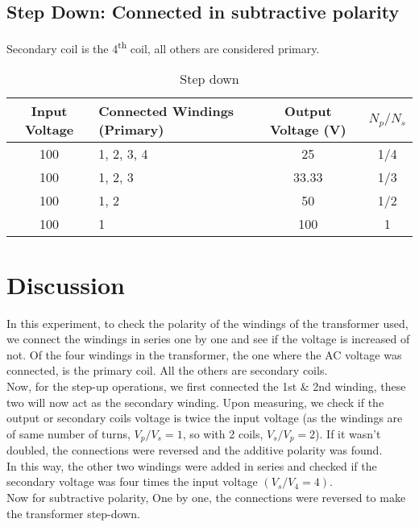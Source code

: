\documentclass[12pt]{article}
\begin{document}
\subsection*{Step Down: Connected in subtractive polarity}
Secondary coil is the 4\textsuperscript{th} coil, all others are considered primary.
\begin{table}[H]
    \centering
    \begin{tabular}{|c|l|c|c|}
        \hline
        Input Voltage & Connected Windings (Primary) & Output Voltage (V) & $N_p/N_s$ \\
        \hline
        100           & 1, 2, 3, 4                   & 25                 & 1/4       \\
        \hline
        100           & 1, 2, 3                      & 33.33              & 1/3       \\
        \hline
        100           & 1, 2                         & 50                 & 1/2       \\
        \hline
        100           & 1                            & 100                & 1         \\
        \hline
    \end{tabular}
    \caption{Step down}
\end{table}

\pagebreak
\section{Discussion}
In this experiment, to check the polarity of the windings of the transformer used, we connect the windings in series one by one and see if the voltage is increased of not. Of the four windings in the transformer, the one where the AC voltage was connected, is the primary coil. All the others are secondary coils. \\
Now, for the step-up operations, we first connected the 1st \& 2nd winding, these two will now act as the secondary winding. Upon measuring, we check if the output or secondary coils voltage is twice the input voltage (as the windings are of same number of turns, $V_p/V_s = 1$, so with 2 coils, $V_s/V_p = 2$). If it wasn't doubled, the connections were reversed and the additive polarity was found. \\
In this way, the other two windings were added in series and checked if the secondary voltage was four times the input voltage $(V_s/V_4 = 4)$.\\
Now for subtractive polarity, One by one, the connections were reversed to make the transformer step-down.
\end{document}
